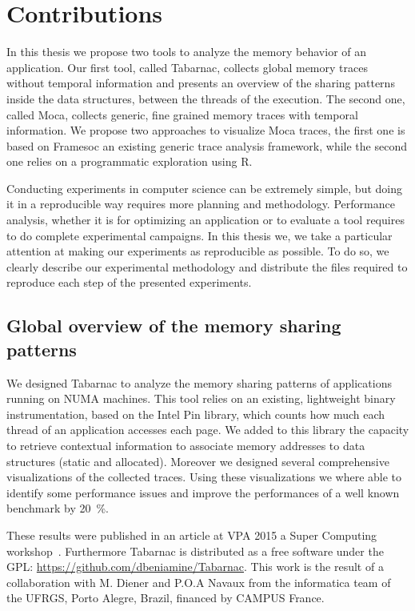 \section{Contributions}

In this thesis we propose two tools to analyze the memory behavior of an application.
Our first tool, called \gls{Tabarnac}, collects global memory traces without temporal information and presents an overview of the sharing patterns inside the data structures, between the threads of the execution.
The second one, called \gls{Moca}, collects generic, fine grained  memory traces with temporal information.
We propose two approaches to visualize \gls{Moca} traces, the first one is based on \gls{Framesoc} an existing generic trace analysis framework, while the second one relies on a programmatic exploration using \gls{R}.

Conducting experiments in computer science can be extremely simple, but doing it in a reproducible way requires more planning and methodology.
Performance analysis, whether it is for optimizing an application or to evaluate a tool requires to do complete experimental campaigns.
In this thesis we, we take a particular attention at making our experiments as reproducible as possible.
To do so, we clearly describe our experimental methodology and distribute the files required to reproduce each step of the presented experiments.

\subsection{Global overview of the memory sharing patterns}

We designed \gls{Tabarnac} to analyze the memory sharing patterns of applications running on \gls{NUMA} machines.
This tool relies on an existing, lightweight binary instrumentation, based on the \gls{Intel} \gls{Pin} library, which counts how much each thread of an application accesses each page.
We added to this library the capacity to retrieve contextual information to associate memory addresses to data structures (static and allocated).
Moreover we designed several comprehensive visualizations of the collected traces.
Using these visualizations we where able to identify some performance issues and improve the performances of a well known benchmark by \SI{20}{\%}.

These results were published in an article at \gls{VPA} 2015 a Super Computing workshop~\cite{Beniamine15TABARNAC}.
Furthermore \gls{Tabarnac} is distributed as a free software under the \gls{GPL}: \url{https://github.com/dbeniamine/Tabarnac}.
This work is the result of a collaboration with M. Diener and P.O.A Navaux from the informatica team of the \gls{UFRGS}, Porto Alegre, Brazil, financed by CAMPUS France.

